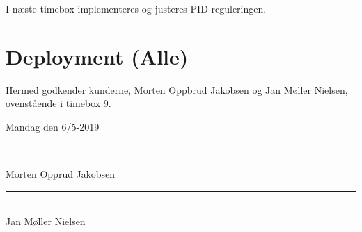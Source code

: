 I næste timebox implementeres og justeres PID-reguleringen.
\clearpage
\section{Deployment (Alle)}
\label{sec:deployment}

Hermed godkender kunderne, Morten Oppbrud Jakobsen og Jan Møller Nielsen, ovenstående i timebox 9.

Mandag den 6/5-2019

\begin{minipage}{.5\textwidth}
  \begin{center}
    \vspace{1.4cm}
    \rule{0.8\textwidth}{0.1pt}\\
    \small{Morten Opprud Jakobsen\\%
    }
  \end{center}
\end{minipage}%
\begin{minipage}{0.5\textwidth}
  \begin{center}
    \vspace{1.4cm}
    \rule{0.8\textwidth}{0.1pt}\\
    \small{Jan Møller Nielsen\\%
    }
  \end{center}
\end{minipage}

